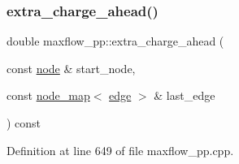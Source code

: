 \mbox{\label{classmaxflow__pp_af60a96de8ef929ceefd32d387e8e1638}} 
\subsubsection{\texorpdfstring{extra\+\_\+charge\+\_\+ahead()}{extra\_charge\_ahead()}}
{\footnotesize\ttfamily double maxflow\+\_\+pp\+::extra\+\_\+charge\+\_\+ahead (\begin{DoxyParamCaption}\item[{const \mbox{\hyperlink{classnode}{node}} \&}]{start\+\_\+node,  }\item[{const \mbox{\hyperlink{classnode__map}{node\+\_\+map}}$<$ \mbox{\hyperlink{classedge}{edge}} $>$ \&}]{last\+\_\+edge }\end{DoxyParamCaption}) const\hspace{0.3cm}{\ttfamily [protected]}}



Definition at line 649 of file maxflow\+\_\+pp.\+cpp.


